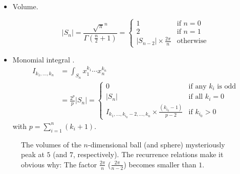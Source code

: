 \documentclass[draft]{scrartcl}
\begin{document}
\begin{itemize}
  \item Volume.

\begin{equation}\label{ndimball}
  |S_n|
  = \frac{\sqrt{\pi}^n}{\Gamma(\frac{n}{2}+1)}
  = \begin{cases}
     1&\text{if $n = 0$}\\
     2&\text{if $n = 1$}\\
     |S_{n-2}| \times \frac{2\pi}{n}&\text{otherwise}
  \end{cases}
\end{equation}

\item Monomial integral \cite{folland}.
\begin{equation}
  \begin{split}
    I_{k_1,\dots,k_n}
    &= \int_{S_n} x_1^{k_1}\cdots x_n^{k_n}\\
    &= \frac{2^p}{p} |S_n|
    =\begin{cases}
      0&\text{if any $k_i$ is odd}\\
      |S_n|&\text{if all $k_i=0$}\\
      I_{k_1,\dots,k_{i_0}-2,\dots,k_n} \times \frac{(k_{i_0} - 1)}{p - 2}&\text{if $k_{i_0} > 0$}
    \end{cases}
  \end{split}
\end{equation}
with $p=\sum_{i=1}^n (k_i+1)$.
\end{itemize}

\begin{figure}
\centering

  \caption{The volumes of the $n$-dimensional ball (and sphere) mysteriously peak at $5$
  (and $7$, respectively). The recurrence relations make it obvious why: The factor
  $\frac{2\pi}{n}$ ($\frac{2\pi}{n-2}$) becomes smaller than $1$.}
\end{figure}
\end{document}

